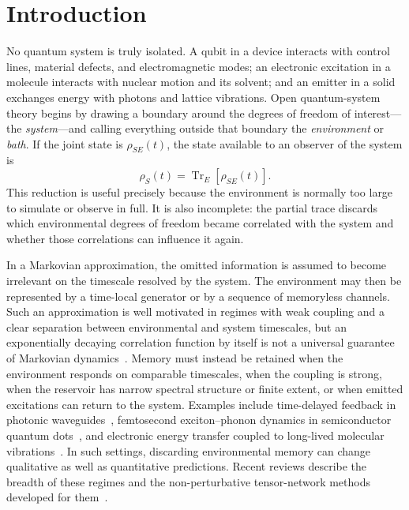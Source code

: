 \section{Introduction}
\label{sec:intro}

No quantum system is truly isolated.  A qubit in a device interacts with control lines, material defects, and electromagnetic modes; an electronic excitation in a molecule interacts with nuclear motion and its solvent; and an emitter in a solid exchanges energy with photons and lattice vibrations.  Open quantum-system theory begins by drawing a boundary around the degrees of freedom of interest---the \emph{system}---and calling everything outside that boundary the \emph{environment} or \emph{bath}.  If the joint state is $\rho_{SE}(t)$, the state available to an observer of the system is
\begin{equation}
    \rho_S(t)=\operatorname{Tr}_E\!\left[\rho_{SE}(t)\right].
\end{equation}
This reduction is useful precisely because the environment is normally too large to simulate or observe in full.  It is also incomplete: the partial trace discards which environmental degrees of freedom became correlated with the system and whether those correlations can influence it again.

In a Markovian approximation, the omitted information is assumed to become irrelevant on the timescale resolved by the system.  The environment may then be represented by a time-local generator or by a sequence of memoryless channels.  Such an approximation is well motivated in regimes with weak coupling and a clear separation between environmental and system timescales, but an exponentially decaying correlation function by itself is not a universal guarantee of Markovian dynamics~\cite{Rivas2014,deVega2017}.  Memory must instead be retained when the environment responds on comparable timescales, when the coupling is strong, when the reservoir has narrow spectral structure or finite extent, or when emitted excitations can return to the system.  Examples include time-delayed feedback in photonic waveguides~\cite{Pichler2016}, femtosecond exciton--phonon dynamics in semiconductor quantum dots~\cite{Liu2019}, and electronic energy transfer coupled to long-lived molecular vibrations~\cite{Chin2013}.  In such settings, discarding environmental memory can change qualitative as well as quantitative predictions.  Recent reviews describe the breadth of these regimes and the non-perturbative tensor-network methods developed for them~\cite{Keeling2026,LacroixReview2026}.

